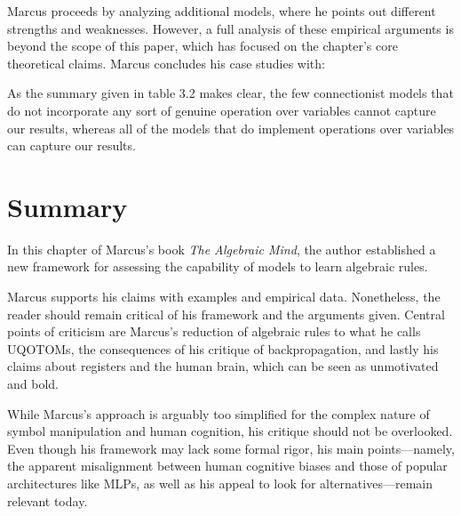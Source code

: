 \documentclass[../../main.tex]{subfiles}
\begin{document}
Marcus proceeds by analyzing additional models, where he points out different strengths and weaknesses. However, a full analysis of these empirical arguments is beyond the scope of this paper, which has focused on the chapter's core theoretical claims. Marcus concludes his case studies with:

\begin{citecallout}
    As the summary given in table 3.2 makes clear, the
    few connectionist models that do not incorporate any sort of genuine operation over variables cannot capture our results, whereas all of the models that do implement operations over variables can capture our results.
\end{citecallout}

\pagebreak
\section{Summary}
In this chapter of Marcus's book \emph{The Algebraic Mind}, the author established a new framework for assessing the capability of models to learn algebraic rules.

Marcus supports his claims with examples and empirical data. Nonetheless, the reader should remain critical of his framework and the arguments given. Central points of criticism are Marcus's reduction of algebraic rules to what he calls UQOTOMs, the consequences of his critique of backpropagation, and lastly his claims about registers and the human brain, which can be seen as unmotivated and bold.

While Marcus's approach is arguably too simplified for the complex nature of symbol manipulation and human cognition, his critique should not be overlooked. Even though his framework may lack some formal rigor, his main points—namely, the apparent misalignment between human cognitive biases and those of popular architectures like MLPs, as well as his appeal to look for alternatives—remain relevant today.
\end{document}
